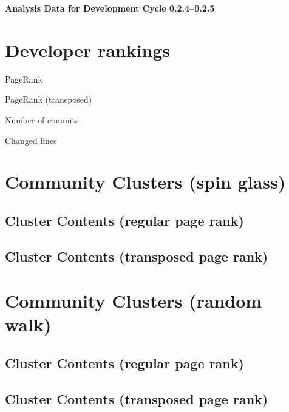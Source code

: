 \documentclass{article}
\begin{document}
\setlength{\parindent}{0pt}
\begin{center}
\begin{Large}
\textbf{Analysis Data for Development Cycle 0.2.4--0.2.5}
\end{Large}
\end{center}
\section{Developer rankings}
\begin{small}\renewcommand{\tabcolsep}{1pt}
\begin{minipage}{0.5\linewidth}
PageRank\\

\end{minipage}%
\begin{minipage}{0.5\linewidth}
PageRank (transposed)\\

\end{minipage}

\renewcommand{\tabcolsep}{5pt}
\begin{minipage}{0.5\linewidth}
Number of commits\\

\end{minipage}%
\begin{minipage}{0.5\linewidth}
Changed lines\\

\end{minipage}
\end{small}
\newpage\section{Community Clusters (spin glass)}
\subsection{Cluster Contents (regular page rank)}
\newpage\subsection{Cluster Contents (transposed page rank)}
\newpage\section{Community Clusters (random walk)}
\subsection{Cluster Contents (regular page rank)}
\newpage\subsection{Cluster Contents (transposed page rank)}
\end{document}
